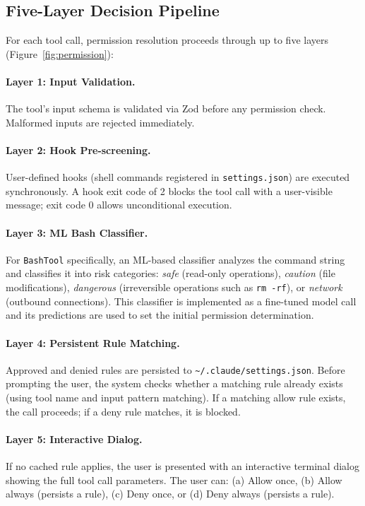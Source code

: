 \documentclass{article}
\begin{document}
\subsection{Five-Layer Decision Pipeline}

For each tool call, permission resolution proceeds through up to five layers (Figure~\ref{fig:permission}):

\paragraph{Layer 1: Input Validation.} The tool's input schema is validated via Zod before any permission check. Malformed inputs are rejected immediately.

\paragraph{Layer 2: Hook Pre-screening.} User-defined hooks (shell commands registered in \texttt{settings.json}) are executed synchronously. A hook exit code of 2 blocks the tool call with a user-visible message; exit code 0 allows unconditional execution.

\paragraph{Layer 3: ML Bash Classifier.} For \texttt{BashTool} specifically, an ML-based classifier analyzes the command string and classifies it into risk categories: \textit{safe} (read-only operations), \textit{caution} (file modifications), \textit{dangerous} (irreversible operations such as \texttt{rm -rf}), or \textit{network} (outbound connections). This classifier is implemented as a fine-tuned model call and its predictions are used to set the initial permission determination.

\paragraph{Layer 4: Persistent Rule Matching.} Approved and denied rules are persisted to \texttt{\textasciitilde/.claude/settings.json}. Before prompting the user, the system checks whether a matching rule already exists (using tool name and input pattern matching). If a matching allow rule exists, the call proceeds; if a deny rule matches, it is blocked.

\paragraph{Layer 5: Interactive Dialog.} If no cached rule applies, the user is presented with an interactive terminal dialog showing the full tool call parameters. The user can: (a) Allow once, (b) Allow always (persists a rule), (c) Deny once, or (d) Deny always (persists a rule).
\end{document}
